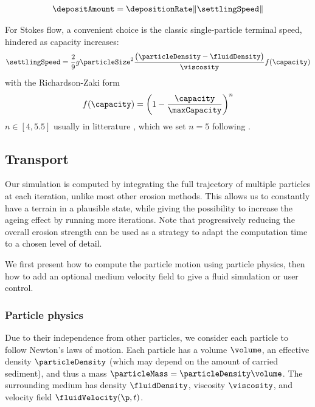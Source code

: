 \begin{align}
    \label{eq:erosion-deltaDepositon}
    \depositAmount = \depositionRate \| \settlingSpeed \|
\end{align}

For Stokes flow, a convenient choice is the classic single-particle terminal speed, hindered as capacity increases:
\begin{align}
    \label{eq:erosion-initialSettlingVelocity}
    \settlingSpeed = \frac{2}{9} g \particleSize^2 \frac{\big(\particleDensity - \fluidDensity\big)}{\viscosity} f(\capacity)
\end{align}
with the Richardson-Zaki form
\begin{align}
    \label{eq:erosion-Richardson}
    f(\capacity) = \left( 1 - \frac{\capacity}{ \maxCapacity } \right)^{n}
\end{align}
$n \in [4,5.5]$ usually in litterature \cite{Richardson1954}, which we set $n=5$ following \cite{Wojtan2007,Kristof2009}. %

\subsection{Transport}
Our simulation is computed by integrating the full trajectory of multiple particles at each iteration, unlike most other erosion methods. This allows us to constantly have a terrain in a plausible state, while giving the possibility to increase the ageing effect by running more iterations. 
Note that progressively reducing the overall erosion strength can be used as a strategy to adapt the computation time to a chosen level of detail.

We first present how to compute the particle motion using particle physics, then how to add an optional medium velocity field to give a fluid simulation or user control.

\subsubsection{Particle physics}
Due to their independence from other particles, we consider each particle to follow Newton’s laws of motion. Each particle has a volume $\volume$, an effective density $\particleDensity$ (which may depend on the amount of carried sediment), and thus a mass $\particleMass = \particleDensity \volume$. The surrounding medium has density $\fluidDensity$, viscosity $\viscosity$, and velocity field $\fluidVelocity(\p,t)$.

